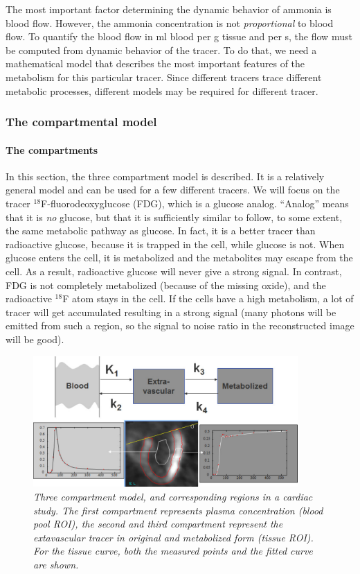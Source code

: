 \documentclass[11pt,oneside]{article}
\begin{document}
The most important factor determining the dynamic behavior of ammonia
is blood flow. However, the ammonia concentration is not {\em
proportional} to blood flow. To quantify the blood flow in ml blood
per g tissue and per s, the flow must be computed from dynamic
behavior of the tracer. To do that, we need a mathematical model that
describes the most important features of the metabolism for this
particular tracer. Since different tracers trace different metabolic
processes, different models may be required for different tracer.

\subsubsection{The compartmental model}
\paragraph{The compartments}
In this section, the three compartment model is described. It is a
relatively general model and can be used for a few different
tracers. We will focus on the tracer $^{18}$F-fluorodeoxyglucose
(FDG), which is a glucose analog.  ``Analog'' means that it is {\em
no} glucose, but that it is sufficiently similar to follow, to some
extent, the same metabolic pathway as glucose. In fact, it is a better
tracer than radioactive glucose, because it is trapped in the cell,
while glucose is not. When glucose enters the cell, it is metabolized
and the metabolites may escape from the cell. As a result, radioactive
glucose will never give a strong signal. In contrast, FDG is not
completely metabolized (because of the missing oxide), and the
radioactive $^{18}$F atom stays in the cell. If the cells have a high
metabolism, a lot of tracer will get accumulated resulting in a strong
signal (many photons will be emitted from such a region, so the signal
to noise ratio in the reconstructed image will be good).

\begin{figure}[tb]
\centering
\includegraphics[width=0.9\textwidth]{figs/fig_kinemodel.pdf}
\caption{\label{fig:kinemodel} \emph{Three compartment model, and
corresponding regions in a cardiac study. The first compartment represents
plasma concentration (blood pool ROI), the second and third compartment
represent the extavascular tracer in original and metabolized form (tissue
ROI). For the tissue curve, both the measured points and the fitted curve are
shown.}}
\end{figure}
\end{document}
